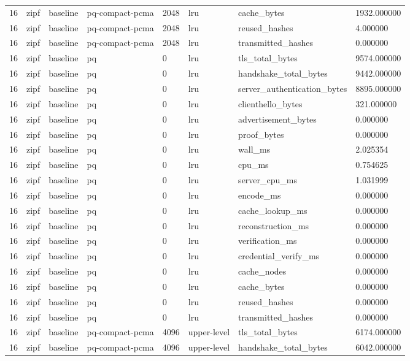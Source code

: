 \begin{tabular}{llllllll}
16 & zipf & baseline & pq-compact-pcma & 2048 & lru & cache\_bytes & 1932.000000 \\
16 & zipf & baseline & pq-compact-pcma & 2048 & lru & reused\_hashes & 4.000000 \\
16 & zipf & baseline & pq-compact-pcma & 2048 & lru & transmitted\_hashes & 0.000000 \\
16 & zipf & baseline & pq & 0 & lru & tls\_total\_bytes & 9574.000000 \\
16 & zipf & baseline & pq & 0 & lru & handshake\_total\_bytes & 9442.000000 \\
16 & zipf & baseline & pq & 0 & lru & server\_authentication\_bytes & 8895.000000 \\
16 & zipf & baseline & pq & 0 & lru & clienthello\_bytes & 321.000000 \\
16 & zipf & baseline & pq & 0 & lru & advertisement\_bytes & 0.000000 \\
16 & zipf & baseline & pq & 0 & lru & proof\_bytes & 0.000000 \\
16 & zipf & baseline & pq & 0 & lru & wall\_ms & 2.025354 \\
16 & zipf & baseline & pq & 0 & lru & cpu\_ms & 0.754625 \\
16 & zipf & baseline & pq & 0 & lru & server\_cpu\_ms & 1.031999 \\
16 & zipf & baseline & pq & 0 & lru & encode\_ms & 0.000000 \\
16 & zipf & baseline & pq & 0 & lru & cache\_lookup\_ms & 0.000000 \\
16 & zipf & baseline & pq & 0 & lru & reconstruction\_ms & 0.000000 \\
16 & zipf & baseline & pq & 0 & lru & verification\_ms & 0.000000 \\
16 & zipf & baseline & pq & 0 & lru & credential\_verify\_ms & 0.000000 \\
16 & zipf & baseline & pq & 0 & lru & cache\_nodes & 0.000000 \\
16 & zipf & baseline & pq & 0 & lru & cache\_bytes & 0.000000 \\
16 & zipf & baseline & pq & 0 & lru & reused\_hashes & 0.000000 \\
16 & zipf & baseline & pq & 0 & lru & transmitted\_hashes & 0.000000 \\
16 & zipf & baseline & pq-compact-pcma & 4096 & upper-level & tls\_total\_bytes & 6174.000000 \\
16 & zipf & baseline & pq-compact-pcma & 4096 & upper-level & handshake\_total\_bytes & 6042.000000 \\

\end{tabular}
